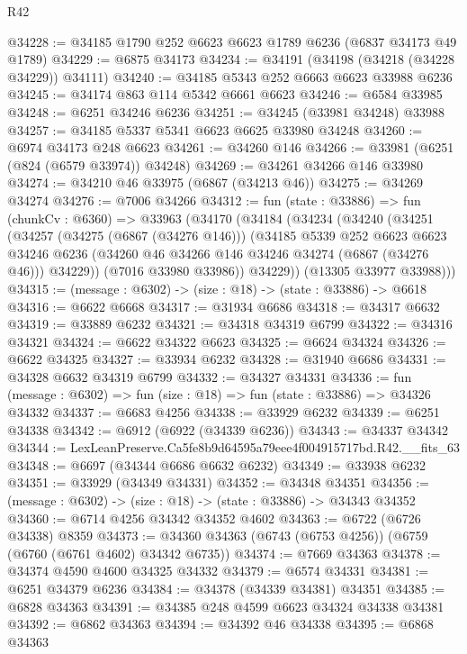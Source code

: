 \begin{lexlean}{R42}
\begin{coremodule}
{@34228 := @34185 @1790 @252 @6623 @6623 @1789 @6236 (@6837 @34173 @49 @1789)
@34229 := @6875 @34173
@34234 := @34191 (@34198 (@34218 (@34228 @34229)) @34111)
@34240 := @34185 @5343 @252 @6663 @6623 @33988 @6236
@34245 := @34174 @863 @114 @5342 @6661 @6623
@34246 := @6584 @33985
@34248 := @6251 @34246 @6236
@34251 := @34245 (@33981 @34248) @33988
@34257 := @34185 @5337 @5341 @6623 @6625 @33980 @34248
@34260 := @6974 @34173 @248 @6623
@34261 := @34260 @146
@34266 := @33981 (@6251 (@824 (@6579 @33974)) @34248)
@34269 := @34261 @34266 @146 @33980
@34274 := @34210 @46 @33975 (@6867 (@34213 @46))
@34275 := @34269 @34274
@34276 := @7006 @34266
@34312 := fun (state : @33886) =>
  fun (chunkCv : @6360) =>
  @33963
    (@34170
      (@34184
        (@34234
          (@34240
            (@34251
              (@34257
                (@34275 (@6867 (@34276 @146)))
                (@34185
                  @5339
                  @252
                  @6623
                  @6623
                  @34246
                  @6236
                  (@34260 @46 @34266 @146 @34246 @34274 (@6867 (@34276 @46)))
                  @34229))
              (@7016 @33980 @33986))
            @34229))
        (@13305 @33977 @33988)))
@34315 := (message : @6302) -> (size : @18) -> (state : @33886) -> @6618
@34316 := @6622 @6668
@34317 := @31934 @6686
@34318 := @34317 @6632
@34319 := @33889 @6232
@34321 := @34318 @34319 @6799
@34322 := @34316 @34321
@34324 := @6622 @34322 @6623
@34325 := @6624 @34324
@34326 := @6622 @34325
@34327 := @33934 @6232
@34328 := @31940 @6686
@34331 := @34328 @6632 @34319 @6799
@34332 := @34327 @34331
@34336 := fun (message : @6302) => fun (size : @18) => fun (state : @33886) => @34326 @34332
@34337 := @6683 @4256
@34338 := @33929 @6232
@34339 := @6251 @34338
@34342 := @6912 (@6922 (@34339 @6236))
@34343 := @34337 @34342
@34344 := LexLeanPreserve.Ca5fe8b9d64595a79eee4f004915717bd.R42.__fits_63
@34348 := @6697 (@34344 @6686 @6632 @6232)
@34349 := @33938 @6232
@34351 := @33929 (@34349 @34331)
@34352 := @34348 @34351
@34356 := (message : @6302) -> (size : @18) -> (state : @33886) -> @34343 @34352
@34360 := @6714 @4256 @34342 @34352 @4602
@34363 := @6722 (@6726 @34338) @8359
@34373 := @34360 @34363 (@6743 (@6753 @4256)) (@6759 (@6760 (@6761 @4602) @34342 @6735))
@34374 := @7669 @34363
@34378 := @34374 @4590 @4600 @34325 @34332
@34379 := @6574 @34331
@34381 := @6251 @34379 @6236
@34384 := @34378 (@34339 @34381) @34351
@34385 := @6828 @34363
@34391 := @34385 @248 @4599 @6623 @34324 @34338 @34381
@34392 := @6862 @34363
@34394 := @34392 @46 @34338
@34395 := @6868 @34363
}
\end{coremodule}
\end{lexlean}
